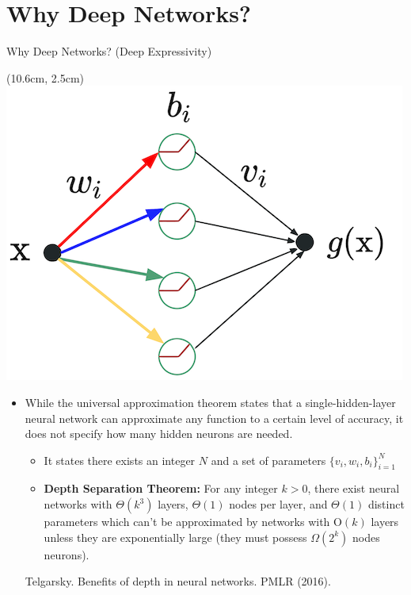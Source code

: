 \documentclass[serif, aspectratio=169]{beamer}
\begin{document}
\section{Why Deep Networks?}
\begin{frame}{Why Deep Networks? (Deep Expressivity)}
	\begin{textblock*}{5cm}(10.6cm, 2.5cm)
		\includegraphics[keepaspectratio, scale=0.3]{pic/mlp}
	\end{textblock*}
	
	\begin{itemize}
		\item While the universal approximation theorem states that \newline a single-hidden-layer neural network can approximate \newline any function to a certain level of accuracy, it does not \newline specify how many hidden neurons are needed.
		\begin{itemize}
			\item It states there exists an integer $N$ and a set of \newline parameters $\{v_i,w_i,b_i\}_{i=1}^N$
			\item \textbf{Depth Separation Theorem:} For any integer $k>0$, \newline there exist neural networks with $\Theta(k^3)$ layers, $\Theta(1)$ \newline nodes per layer, and $\Theta(1)$ distinct parameters which \newline can't be approximated by networks with {O}$(k)$ layers \newline unless they are exponentially large (they must possess \newline $\Omega(2^k)$ nodes neurons).
		\end{itemize}
		
		\vspace{1cm}
		\scriptsize Telgarsky. Benefits of depth in neural networks. PMLR (2016).
	\end{itemize}
\end{frame}
\end{document}
